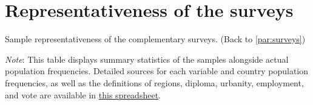 \clearpage
\section{Representativeness of the surveys}\label{app:representativeness}


\begin{table}[h!]
    \caption[Sample representativeness of \textit{US1}, \textit{US2}, \textit{Eu}]{Sample representativeness of the complementary surveys. (Back to \ref{par:surveys}) } \label{tab:representativeness_waves}
    \makebox[\textwidth][c]{
        \resizebox*{!}{.80\textheight}{%
        
        }
    }
    {\footnotesize \textit{Note}: This table displays summary statistics of the samples alongside actual population frequencies. %
    Detailed sources for each variable and country population frequencies, as well as the definitions of regions, diploma, urbanity, employment, and vote are available in \href{https://github.com/bixiou/international_attitudes_toward_global_policies/raw/main/questionnaire/specificities.xlsx}{this spreadsheet}. %
    } %
\end{table}

